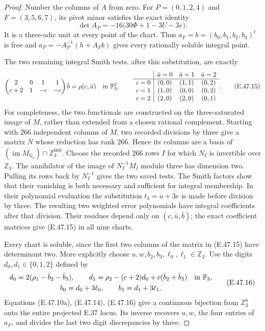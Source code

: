\begin{proof}
Number the columns of $A$ from zero.  For
$P=(0,1,2,4)$ and $F=(3,5,6,7)$, its pivot
minor satisfies the exact identity
\[
 \det A_P=-16\bigl(30\Phi+1-3U-3e\bigr).
 \tag{E.47.14}
\]
It is a three-adic unit at every point of the
chart.  Thus $a_F=b=(b_0,b_1,b_2,b_3)^t$ is
free and $a_P=-A_P^{-1}(h+A_Fb)$ gives every
rationally soluble integral point.

The two remaining integral Smith tests, after
this substitution, are exactly
\[
 \begin{pmatrix}2&0&1&1\\c+2&1&-c&-c\end{pmatrix}
                 \bar b=\rho(c,\bar u)
                       \quad\hbox{in }\mathbb F_3^2,
 \qquad
 \begin{array}{c|ccc}
 &\bar u=0&\bar u=1&\bar u=2\\\hline
 c=0&(0,0)&(1,1)&(0,2)\\
 c=1&(1,0)&(0,0)&(0,2)\\
 c=2&(2,0)&(2,0)&(0,1)
 \end{array}.
 \tag{E.47.15}
\]
For completeness, the two functionals are
constructed on the three-saturated image of
$M$, rather than extended from a chosen rational
complement.  Starting with $266$ independent
columns of $M$, two recorded divisions by three
give a matrix $N$ whose reduction has rank $266$.
Hence its columns are a basis of
$(\operatorname{im}M_{\mathbb Q_3})\cap\mathbb Z_3^{660}$.
Choose the recorded $266$ rows $I$ for which $N_I$
is invertible over $\mathbb Z_3$.  The annihilator of the image
of $N_I^{-1}M_I$ modulo three has dimension two.
Pulling its rows back by $N_I^{-1}$ gives the
two saved tests.  The Smith factors show that
their vanishing is both necessary and sufficient
for integral membership.
In their polynomial evaluation the substitution
$t_3=u+3e$ is made before division by three.
The resulting two weighted error polynomials
have integral coefficients after that division.
Their residues depend only on $(c,\bar u,\bar b)$;
the exact coefficient matrices give
\textup{(E.47.15)} in all nine charts.

Every chart is soluble, since the first two
columns of the matrix in \textup{(E.47.15)}
have determinant two.  More explicitly choose
$u,w,b_2,b_3,\ell_0,\ell_1\in\mathbb Z_3$.
Use the digits $d_0,d_1\in\{0,1,2\}$ defined by
\[
 \begin{gathered}
 d_0=2(\rho_1-\bar b_2-\bar b_3),\qquad
 d_1=\rho_2-(c+2)d_0+c(\bar b_2+\bar b_3)
                                  \quad\hbox{in }\mathbb F_3,\\
 b_0=d_0+3\ell_0,\qquad b_1=d_1+3\ell_1.
 \end{gathered}
 \tag{E.47.16}
\]
Equations \textup{(E.47.10a), (E.47.14), (E.47.16)}
give a continuous bijection from $\mathbb Z_3^6$
onto the entire projected E.37 locus.  Its inverse
recovers $u,w$, the four entries of $a_F$, and
divides the last two digit discrepancies by three.


\end{proof}
